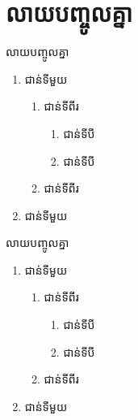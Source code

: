 \documentclass[12pt,serif]{beamer}
\begin{document}
    \section{លាយបញ្ចូលគ្នា}
    \begin{frame}{លាយបញ្ចូលគ្នា}
        \begin{theorem}
            \begin{enumerate}[A]
            \item ជាន់ទីមួយ
            \begin{enumerate}[1]
                \item ជាន់ទីពីរ
                \begin{enumerate}[i]
                    \item ជាន់ទីបី
                    \item ជាន់ទីបី
                \end{enumerate}
                \item ជាន់ទីពីរ
            \end{enumerate}
            \item ជាន់ទីមួយ
        \end{enumerate}
        \end{theorem}
    \end{frame}
    \begin{frame}{លាយបញ្ចូលគ្នា}
        \begin{example}
            \begin{enumerate}[I]
                \item ជាន់ទីមួយ
                \begin{enumerate}[1]
                    \item ជាន់ទីពីរ
                    \begin{enumerate}[a]
                        \item ជាន់ទីបី
                        \item ជាន់ទីបី
                    \end{enumerate}
                    \item ជាន់ទីពីរ
                \end{enumerate}
                \item ជាន់ទីមួយ
            \end{enumerate}
        \end{example}
    \end{frame}
\end{document}
